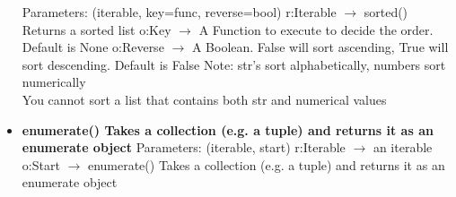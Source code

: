 \documentclass{report}
\begin{document}
\begin{itemize}
          \smallbreak \noindent
          Parameters: (iterable, key=func, reverse=bool)
          \smallbreak \noindent
          r:Iterable $\rightarrow$ sorted()	Returns a sorted list
          \smallbreak \noindent
          o:Key $\rightarrow$ A Function to execute to decide the order. Default is None
          \smallbreak \noindent
          o:Reverse $\rightarrow$ A Boolean. False will sort ascending, True will sort descending. Default is False
          \smallbreak \noindent
          Note: str's sort alphabetically, numbers sort numerically \\
          You cannot sort a list that contains both str and numerical values
          \smallbreak \noindent
        \item[\ding{43}] \textbf{enumerate()	Takes a collection (e.g. a tuple) and returns it as an enumerate object}
          \smallbreak \noindent
          Parameters: (iterable, start)
          \smallbreak \noindent
          r:Iterable $\rightarrow$ an iterable
          \smallbreak \noindent
          o:Start $\rightarrow$ enumerate()	Takes a collection (e.g. a tuple) and returns it as an enumerate object
      \end{itemize}
    

    \bigbreak \noindent 
    
\end{document}
